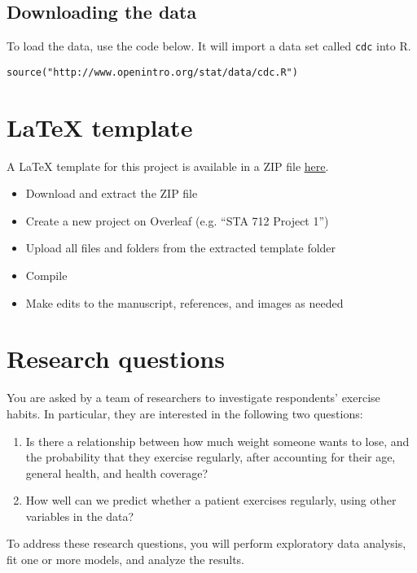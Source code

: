 \documentclass[11pt]{article}
\begin{document}
\subsection*{Downloading the data}

To load the data, use the code below. It will import a data set called \verb;cdc; into R.
\begin{verbatim}
source("http://www.openintro.org/stat/data/cdc.R")
\end{verbatim}

\section*{LaTeX template}

A LaTeX template for this project is available in a ZIP file \href{https://sta712-f23.github.io/projects/report_template.zip}{\underline{here}}.

\begin{itemize}
\item Download and extract the ZIP file
\item Create a new project on Overleaf (e.g. ``STA 712 Project 1'')
\item Upload all files and folders from the extracted template folder
\item Compile
\item Make edits to the manuscript, references, and images as needed
\end{itemize}


\section*{Research questions}

You are asked by a team of researchers to investigate respondents’ exercise habits. In particular, they are interested in the following two questions:
\begin{enumerate}
\item Is there a relationship between how much weight someone wants to lose, and the probability that they exercise regularly, after accounting for their age, general health, and health coverage?

\item How well can we predict whether a patient exercises regularly, using other variables in the data?
\end{enumerate}

\noindent To address these research questions, you will perform exploratory data analysis, fit one or more models, and analyze the results.
\end{document}
